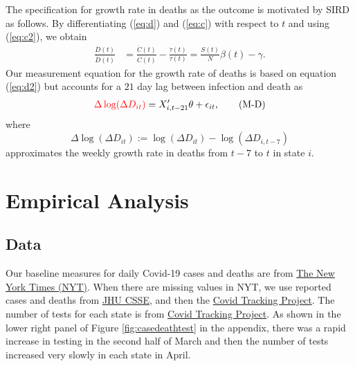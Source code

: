 \documentclass[11pt,reqno,letter]{amsart}
\theoremstyle{definition}
\def\ycolor{\color{red}}
\begin{document}
The specification for growth rate in deaths as the outcome  is motivated by SIRD as follows. By differentiating (\ref{eq:d}) and (\ref{eq:c}) with respect to $t$ and using (\ref{eq:c2}), we obtain
\begin{align}
\frac{\ddot{D}(t) }{\dot D(t)}& = \frac{\ddot{C}(t) }{\dot C(t)}  - \frac{\dot{\tau}(t) }{ \tau(t)}    =  \frac{S(t)}{N}\beta(t)  -   \gamma.\label{eq:d2}
\end{align}
Our measurement equation for the growth rate of deaths is based on equation (\ref{eq:d2}) but   accounts for a $21$ day lag between infection and death as
\begin{align}
{\ycolor \Delta \log(\Delta D_{it})}  = X_{i,t-21}' \theta + \epsilon_{it},\label{eq:M-D} \tag{M-D}
\end{align}
where
\begin{equation} \label{eq:y-d}
 \Delta \log(\Delta D_{it}):= \log( \Delta D_{it} ) -
\log( \Delta D_{i,t-7})
\end{equation}
approximates the weekly growth rate in deaths from $t-7$ to $t$ in state $i$. %


\section{Empirical Analysis}
\subsection{Data}

Our baseline measures for daily Covid-19   cases and deaths are from
\href{https://github.com/nytimes/covid-19-data}{The New York Times (NYT)}. When there are missing values in NYT, we use reported cases and deaths from \href{https://github.com/CSSEGISandData/COVID-19}{JHU CSSE}, and then the
\href{https://github.com/COVID19Tracking/covid-tracking-data}{Covid
Tracking Project}.  The number of tests for each state is from  \href{https://github.com/COVID19Tracking/covid-tracking-data}{Covid
 Tracking Project}. As shown in the lower right panel of Figure \ref{fig:casedeathtest} in the appendix, there was a rapid increase in testing in the second half of March and then the
number of tests increased very slowly in each state in April.
\end{document}
